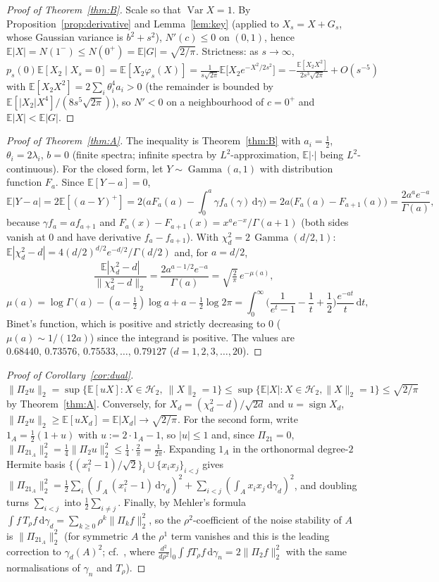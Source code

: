 \documentclass[11pt]{article}
\theoremstyle{remark}
\newcommand{\E}{\mathbb{E}}
\newcommand{\sgn}{\operatorname{sign}}
\newcommand{\Var}{\operatorname{Var}}
\newcommand{\Gam}{\operatorname{Gamma}}
\newcommand{\dd}{\,\mathrm{d}}
\newcommand{\Hil}{\mathcal H}
\begin{document}
\begin{proof}[Proof of Theorem~\ref{thm:B}]
Scale so that $\Var X=1$. By Proposition~\ref{prop:derivative} and Lemma~\ref{lem:key} (applied to $X_s=X+G_s$, whose Gaussian variance is
$b^2+s^2$), $N'(c)\le0$ on $(0,1)$, hence $\E|X|=N(1^-)\le N(0^+)=\E|G|=\sqrt{2/\pi}$.
Strictness: as $s\to\infty$, $p_s(0)\E[X_2\mid X_s=0]=\E[X_2\varphi_s(X)]=\frac{1}{s\sqrt{2\pi}}\E\big[X_2e^{-X^2/2s^2}\big]
=-\frac{\E[X_2X^2]}{2s^3\sqrt{2\pi}}+O(s^{-5})$ with $\E[X_2X^2]=2\sum_i\theta_i^4a_i>0$ (the remainder is bounded by $\E[|X_2|X^4]/(8s^5\sqrt{2\pi})$),
so $N'<0$ on a neighbourhood of $c=0^+$ and $\E|X|<\E|G|$.
\end{proof}

\begin{proof}[Proof of Theorem~\ref{thm:A}]
The inequality is Theorem~\ref{thm:B} with $a_i=\frac12$, $\theta_i=2\lambda_i$, $b=0$ (finite spectra; infinite spectra by $L^2$-approximation,
$\E|\cdot|$ being $L^2$-continuous). For the closed form, let $Y\sim\Gam(a,1)$ with distribution function $F_a$. Since $\E[Y-a]=0$,
\[
\E|Y-a|=2\E[(a-Y)^+]=2\Big(aF_a(a)-\int_0^a\gamma f_a(\gamma)\dd\gamma\Big)=2a\big(F_a(a)-F_{a+1}(a)\big)=\frac{2a^{a}e^{-a}}{\Gamma(a)},
\]
because $\gamma f_a=af_{a+1}$ and $F_a(x)-F_{a+1}(x)=x^ae^{-x}/\Gamma(a+1)$ (both sides vanish at $0$ and have derivative $f_a-f_{a+1}$).
With $\chi^2_d=2\,\Gam(d/2,1)$: $\E|\chi^2_d-d|=4(d/2)^{d/2}e^{-d/2}/\Gamma(d/2)$ and, for $a=d/2$,
\[
\frac{\E|\chi^2_d-d|}{\|\chi^2_d-d\|_2}=\frac{2a^{a-1/2}e^{-a}}{\Gamma(a)}=\sqrt{\tfrac2\pi}\,e^{-\mu(a)},
\]
\[
\mu(a)=\log\Gamma(a)-(a-\tfrac12)\log a+a-\tfrac12\log2\pi=\int_0^\infty\Big(\frac1{e^t-1}-\frac1t+\frac12\Big)\frac{e^{-at}}{t}\dd t,
\]
Binet's function, which is positive and strictly decreasing to $0$ ($\mu(a)\sim1/(12a)$) since the integrand is positive. The values are
$0.68440,\,0.73576,\,0.75533,\dots,\,0.79127$ ($d=1,2,3,\dots,20$).
\end{proof}

\begin{proof}[Proof of Corollary~\ref{cor:dual}]
$\|\Pi_2u\|_2=\sup\{\E[uX]:X\in\Hil_2,\ \|X\|_2=1\}\le\sup\{\E|X|:X\in\Hil_2,\|X\|_2=1\}\le\sqrt{2/\pi}$ by Theorem~\ref{thm:A}.
Conversely, for $X_d=(\chi_d^2-d)/\sqrt{2d}$ and $u=\sgn X_d$, $\|\Pi_2u\|_2\ge\E[uX_d]=\E|X_d|\to\sqrt{2/\pi}$.
For the second form, write $1_A=\tfrac12(1+u)$ with $u:=2\cdot1_A-1$, so $|u|\le1$ and, since $\Pi_21=0$,
$\|\Pi_21_A\|_2^2=\tfrac14\|\Pi_2u\|_2^2\le\tfrac14\cdot\tfrac2\pi=\tfrac1{2\pi}$. Expanding $1_A$ in the orthonormal degree-$2$ Hermite basis
$\{(x_i^2-1)/\sqrt2\}_i\cup\{x_ix_j\}_{i<j}$ gives $\|\Pi_21_A\|_2^2=\tfrac12\sum_i(\int_A(x_i^2-1)\dd\gamma_d)^2+\sum_{i<j}(\int_Ax_ix_j\dd\gamma_d)^2$,
and doubling turns $\sum_{i<j}$ into $\tfrac12\sum_{i\ne j}$. Finally, by Mehler's formula $\int f\,T_\rho f\dd\gamma_d=\sum_{k\ge0}\rho^k\|\Pi_kf\|_2^2$,
so the $\rho^2$-coefficient of the noise stability of $A$ is $\|\Pi_21_A\|_2^2$ (for symmetric $A$ the $\rho^1$ term vanishes and this is the leading
correction to $\gamma_d(A)^2$; cf.\ \cite[eq.~(10)]{Heilman}, where $\frac{d^2}{d\rho^2}\big|_0\int fT_\rho f\dd\gamma_n=2\|\Pi_2f\|_2^2$ with the same
normalisations of $\gamma_n$ and $T_\rho$).
\end{proof}
\end{document}
